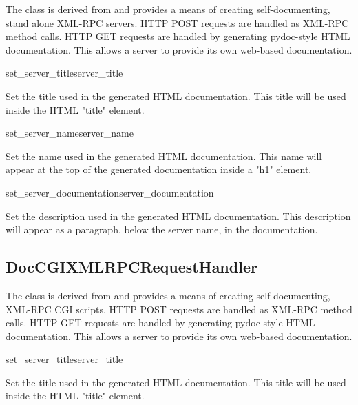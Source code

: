The  class is derived from
 and provides a means of
creating self-documenting, stand alone XML-RPC servers. HTTP POST
requests are handled as XML-RPC method calls. HTTP GET requests are
handled by generating pydoc-style HTML documentation. This allows a
server to provide its own web-based documentation.

\begin{methoddesc}{set_server_title}{server_title}

Set the title used in the generated HTML documentation. This title
will be used inside the HTML "title" element.

\end{methoddesc}

\begin{methoddesc}{set_server_name}{server_name}

Set the name used in the generated HTML documentation. This name will
appear at the top of the generated documentation inside a "h1"
element.

\end{methoddesc}


\begin{methoddesc}{set_server_documentation}{server_documentation}

Set the description used in the generated HTML documentation. This
description will appear as a paragraph, below the server name, in the
documentation.

\end{methoddesc}

\subsection{DocCGIXMLRPCRequestHandler}

The  class is derived from
 and provides a means
of creating self-documenting, XML-RPC CGI scripts. HTTP POST requests
are handled as XML-RPC method calls. HTTP GET requests are handled by
generating pydoc-style HTML documentation. This allows a server to
provide its own web-based documentation.

\begin{methoddesc}{set_server_title}{server_title}

Set the title used in the generated HTML documentation. This title
will be used inside the HTML "title" element.

\end{methoddesc}

